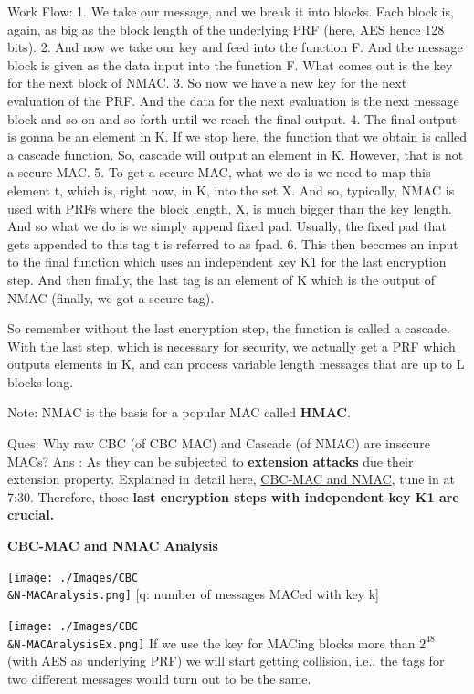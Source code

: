 \documentclass[11pt]{article}
\begin{document}
Work Flow: 1. We take our message, and we break it into blocks. Each
block is, again, as big as the block length of the underlying PRF (here,
AES hence 128 bits). 2. And now we take our key and feed into the
function F. And the message block is given as the data input into the
function F. What comes out is the key for the next block of NMAC. 3. So
now we have a new key for the next evaluation of the PRF. And the data
for the next evaluation is the next message block and so on and so forth
until we reach the final output. 4. The final output is gonna be an
element in K. If we stop here, the function that we obtain is called a
cascade function. So, cascade will output an element in K. However, that
is not a secure MAC. 5. To get a secure MAC, what we do is we need to
map this element t, which is, right now, in K, into the set X. And so,
typically, NMAC is used with PRFs where the block length, X, is much
bigger than the key length. And so what we do is we simply append fixed
pad. Usually, the fixed pad that gets appended to this tag t is referred
to as fpad. 6. This then becomes an input to the final function which
uses an independent key K1 for the last encryption step. And then
finally, the last tag is an element of K which is the output of NMAC
(finally, we got a secure tag).

So remember without the last encryption step, the function is called a
cascade. With the last step, which is necessary for security, we
actually get a PRF which outputs elements in K, and can process variable
length messages that are up to L blocks long.

Note: NMAC is the basis for a popular MAC called \textbf{HMAC}.

Ques: Why raw CBC (of CBC MAC) and Cascade (of NMAC) are insecure MACs?
Ans : As they can be subjected to \textbf{extension attacks} due their
extension property. Explained in detail here,
\href{https://www.coursera.org/learn/crypto/lecture/QYT6i/cbc-mac-and-nmac}{CBC-MAC
and NMAC}, tune in at 7:30. Therefore, those \textbf{last encryption
steps with independent key K1 are crucial.}

\textbf{CBC-MAC and NMAC Analysis}

\texttt{[image: ./Images/CBC\\\&N-MACAnalysis.png]} {[}q: number of
messages MACed with key k{]}

\texttt{[image: ./Images/CBC\\\&N-MACAnalysisEx.png]} If we use the key
for MACing blocks more than \(2^{48}\) (with AES as underlying PRF) we
will start getting collision, i.e., the tags for two different messages
would turn out to be the same.
\end{document}

